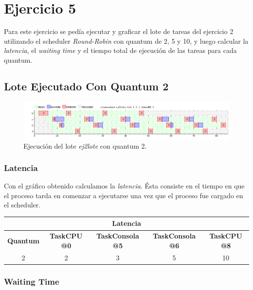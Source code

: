 \section{Ejercicio 5}


Para este ejercicio se pedía ejecutar y graficar el lote de tareas del ejercicio 2 utilizando el scheduler \emph{Round-Robin} con quantum de 2, 5 y 10, y luego calcular la \textit{latencia}, el \textit{waiting time} y el tiempo total de ejecución de las tareas para cada quantum.

\subsection{Lote Ejecutado Con Quantum 2}

\begin{figure}[!h]
	\begin{center}
		\includegraphics[width=500px]{imagenes/ej5_2.png}
		\caption{Ejecución del lote \emph{ej2lote} con quantum 2.}
		\label{fig:grafico_ej5_2}
	\end{center}
\end{figure}


\subsubsection{Latencia} \label{explicacion_latencia}

Con el gráfico obtenido calculamos la \emph{latencia}. Ésta consiste en el tiempo en que el proceso tarda en comenzar a ejecutarse una vez que el proceso fue cargado en el scheduler.

\begin{center}
	\begin{tabular}{|c|c|c|c|c|}
		\hline
		\multicolumn{5}{|c|}{\large{\textbf{Latencia}}} \\
		\hline
		\textbf{Quantum} & \textbf{TaskCPU @0} & \textbf{TaskConsola @5} & \textbf{TaskConsola @6} & \textbf{TaskCPU @8} \\
		\hline
		2 & 2 & 3 & 5 & 10 \\
		\hline
	\end{tabular}
\end{center}


\subsubsection{Waiting Time} \label{explicacion_waiting_time}

